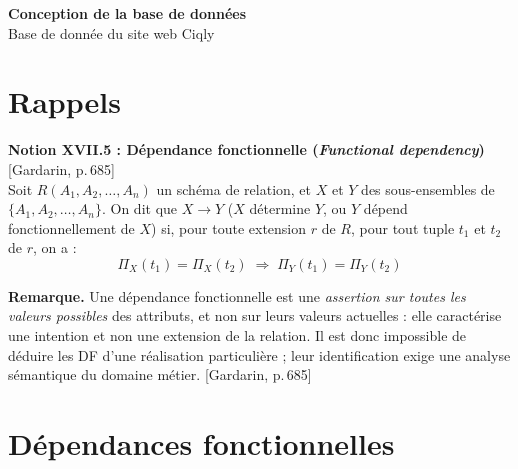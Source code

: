 \documentclass[12pt, a4paper]{article}
\newcommand{\citeg}[1]{\textnormal{\footnotesize[#1]}}
\begin{document}
    \begin{titlepage}
        \centering
        \vspace*{3cm}
        {\LARGE \textbf{Conception de la base de données}}\\[1em]
        {\large Base de donnée du site web Ciqly}\\[3cm]
        \vfill
    \end{titlepage}

    \tableofcontents
    \newpage



    \section{Rappels}

    \begin{rappelbox}
        \textbf{Notion XVII.5 : Dépendance fonctionnelle (\textit{Functional dependency})}
        \hfill\citeg{Gardarin, p.\,685}\\[0.5em]
        Soit $R(A_1, A_2, \ldots, A_n)$ un schéma de relation, et $X$ et $Y$ des sous-ensembles de
        $\{A_1, A_2, \ldots, A_n\}$. On dit que $X \rightarrow Y$ ($X$ détermine $Y$, ou $Y$ dépend
        fonctionnellement de $X$) si, pour toute extension $r$ de $R$, pour tout tuple $t_1$ et $t_2$ de
        $r$, on a :
        \[
            \Pi_X(t_1) = \Pi_X(t_2) \;\Rightarrow\; \Pi_Y(t_1) = \Pi_Y(t_2)
        \]
    \end{rappelbox}

    \begin{notebox}
        \small
        \textbf{Remarque.} Une dépendance fonctionnelle est une \emph{assertion sur toutes les valeurs
        possibles} des attributs, et non sur leurs valeurs actuelles : elle caractérise une intention et non
        une extension de la relation. Il est donc impossible de déduire les DF d'une réalisation particulière ;
        leur identification exige une analyse sémantique du domaine métier.
        \hfill\citeg{Gardarin, p.\,685}
    \end{notebox}



    \section{Dépendances fonctionnelles}
\end{document}
